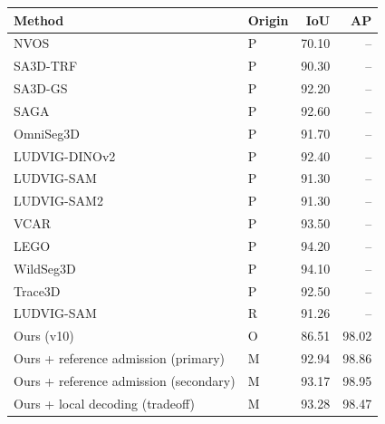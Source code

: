 \begin{tabular}{llrr}
\toprule
Method & Origin & IoU & AP \\
\midrule
NVOS \cite{ludvig} & P & 70.10 & -- \\
SA3D-TRF \cite{ludvig} & P & 90.30 & -- \\
SA3D-GS \cite{ludvig} & P & 92.20 & -- \\
SAGA \cite{ludvig} & P & 92.60 & -- \\
OmniSeg3D \cite{ludvig} & P & 91.70 & -- \\
LUDVIG-DINOv2 \cite{ludvig} & P & 92.40 & -- \\
LUDVIG-SAM \cite{ludvig} & P & 91.30 & -- \\
LUDVIG-SAM2 \cite{ludvig} & P & 91.30 & -- \\
VCAR \cite{vcar} & P & 93.50 & -- \\
LEGO \cite{lego} & P & 94.20 & -- \\
WildSeg3D \cite{wildseg3d} & P & 94.10 & -- \\
Trace3D \cite{trace3d} & P & 92.50 & -- \\
LUDVIG-SAM & R & 91.26 & -- \\
Ours (v10) & O & 86.51 & 98.02 \\
Ours + reference admission (primary) & M & 92.94 & 98.86 \\
Ours + reference admission (secondary) & M & 93.17 & 98.95 \\
Ours + local decoding (tradeoff) & M & 93.28 & 98.47 \\
\bottomrule
\end{tabular}
